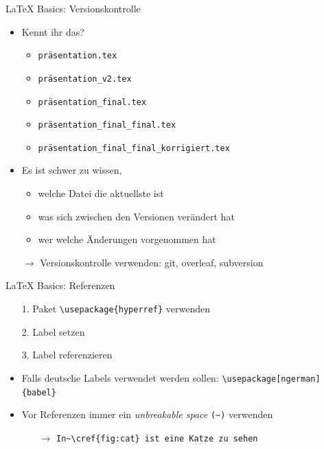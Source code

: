 \documentclass[main.tex]{subfiles}
\begin{document}
\begin{frame}[fragile]{\LaTeX{} Basics: Versionskontrolle}
	\begin{itemize}
		\item Kennt ihr das?
		      \begin{itemize}
			      \item \verb|präsentation.tex|
			            \pause
			      \item \verb|präsentation_v2.tex|
			            \pause
			      \item \verb|präsentation_final.tex|
			            \pause
			      \item \verb|präsentation_final_final.tex|
			            \pause
			      \item \verb|präsentation_final_final_korrigiert.tex|
		      \end{itemize}
		      \medskip
		      \pause
		\item Es ist schwer zu wissen,
		      \begin{itemize}
			      \item welche Datei die aktuellste ist
			      \item was sich zwischen den Versionen verändert hat
			      \item wer welche Änderungen vorgenommen hat
		      \end{itemize}
		      \pause
		      \medskip
		\item[$\to$] Versionskontrolle verwenden\pause: git\pause, overleaf\pause, subversion
	\end{itemize}

\end{frame}

\begin{frame}[fragile]{\LaTeX{} Basics: Referenzen}
	\begin{itemize}
		\item[1.] Paket \verb|\usepackage{hyperref}| verwenden
			\pause
		\item[2.] Label setzen
			\pause
		\item[3.] Label referenzieren
			\medskip
			\pause
		\item Falls deutsche Labels verwendet werden sollen: \verb|\usepackage[ngerman]{babel}|
		      \pause
		      \medskip
		\item Vor Referenzen immer ein \emph{unbreakable space} \verb|(~)| verwenden
		      \begin{itemize}
			      \item[$\to$] \verb|In~\cref{fig:cat} ist eine Katze zu sehen|
		      \end{itemize}
	\end{itemize}
\end{frame}
\end{document}
